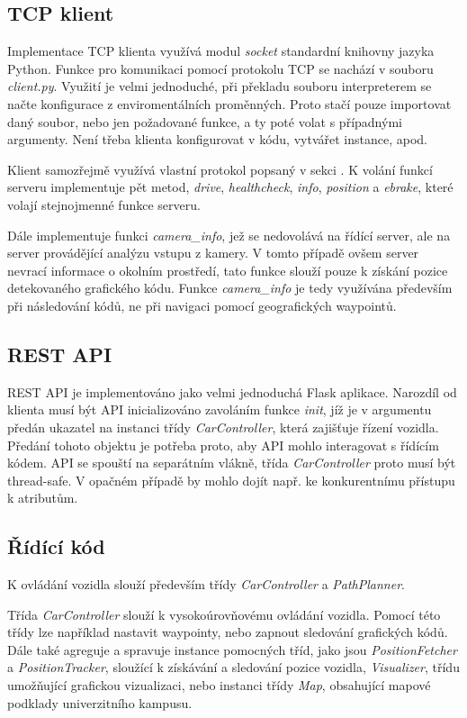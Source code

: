 \documentclass[czech, bachelor]{diploma}
\begin{document}
\subsection{TCP klient}

Implementace TCP klienta využívá modul \emph{socket} standardní knihovny jazyka Python. Funkce pro komunikaci pomocí protokolu TCP
se nachází v souboru \emph{client.py}. Využití je velmi jednoduché, při překladu souboru interpreterem se načte konfigurace
z enviromentálních proměnných. Proto stačí pouze importovat daný soubor, nebo jen požadované funkce, a ty poté volat s případnými
argumenty. Není třeba klienta konfigurovat v kódu, vytvářet instance, apod.

Klient samozřejmě využívá vlastní protokol popsaný v sekci . K volání funkcí serveru implementuje pět
metod, \emph{drive}, \emph{healthcheck}, \emph{info}, \emph{position} a \emph{ebrake}, které volají stejnojmenné funkce serveru.

Dále implementuje funkci \emph{camera\_info}, jež se nedovolává na řídící server, ale na server provádějící analýzu vstupu
z kamery. V tomto případě ovšem server nevrací informace o okolním prostředí, tato funkce slouží pouze k získání pozice
detekovaného grafického kódu. Funkce \emph{camera\_info} je tedy využívána především při následování kódů, ne při navigaci pomocí
geografických waypointů.

\subsection{REST API}

REST API je implementováno jako velmi jednoduchá Flask aplikace. Narozdíl od klienta musí být API inicializováno zavoláním funkce
\emph{init}, jíž je v argumentu předán ukazatel na instanci třídy \emph{CarController}, která zajišťuje řízení vozidla. Předání
tohoto objektu je potřeba proto, aby API mohlo interagovat s řídícím kódem. API se spouští na separátním vlákně, třída
\emph{CarController} proto musí být thread-safe. V opačném případě by mohlo dojít např. ke konkurentnímu přístupu k atributům.

\subsection{Řídící kód}

K ovládání vozidla slouží především třídy \emph{CarController} a \emph{PathPlanner}.

Třída \emph{CarController} slouží k vysokoúrovňovému ovládání vozidla. Pomocí této třídy lze například nastavit waypointy, nebo
zapnout sledování grafických kódů. Dále také agreguje a spravuje instance pomocných tříd, jako jsou \emph{PositionFetcher}
a \emph{PositionTracker}, sloužící k získávání a sledování pozice vozidla, \emph{Visualizer}, třídu umožňující grafickou
vizualizaci, nebo instanci třídy \emph{Map}, obsahující mapové podklady univerzitního kampusu.
\end{document}
